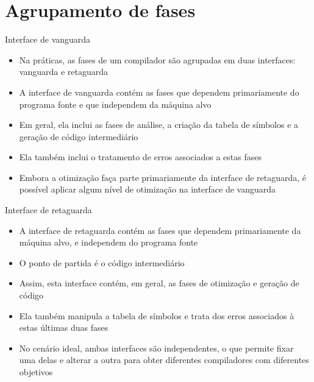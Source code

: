 \section{Agrupamento de fases}

\begin{frame}[fragile]{Interface de vanguarda}

    \begin{itemize}
        \item Na práticas, as fases de um compilador são agrupadas em duas interfaces: vanguarda e retaguarda

        \item A interface de vanguarda contém as fases que dependem primariamente do programa fonte e que independem da máquina alvo

        \item Em geral, ela inclui as fases de análise, a criação da tabela de símbolos e a geração de código intermediário

        \item Ela também inclui o tratamento de erros associados a estas fases

        \item Embora a otimização faça parte primariamente da interface de retaguarda, é possível aplicar algum nível de otimização na interface de
        vanguarda
    \end{itemize}

\end{frame}

\begin{frame}[fragile]{Interface de retaguarda}

    \begin{itemize}
        \item A interface de retaguarda contém as fases que dependem primariamente da máquina alvo, e independem do programa fonte

        \item O ponto de partida é o código intermediário

        \item Assim, esta interface contém, em geral, as fases de otimização e geração de código

        \item Ela também manipula a tabela de símbolos e trata dos erros associados à estas últimas duas fases

        \item No cenário ideal, ambas interfaces são independentes, o que permite fixar uma delas e alterar a outra para obter diferentes compiladores com
        diferentes objetivos
    \end{itemize}

\end{frame}

